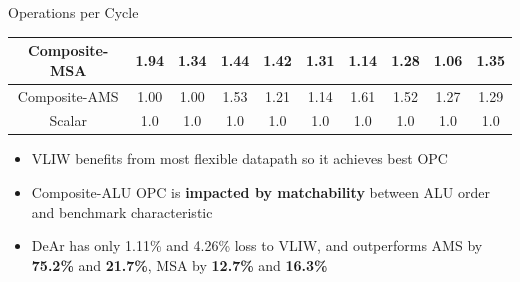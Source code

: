 \documentclass{beamer}
\begin{document}
\begin{CJK}{UTF8}{bkai}
\begin{frame}{Operations per Cycle}
\begin{table}[!ht]
{\begin{tabular}{|c|c|c|c|c|c|c|c|c|c|}
                            Composite-MSA  &   1.94  &   1.34  &   1.44  &   1.42  &   1.31  &   1.14  &   1.28  &   1.06  &   1.35     \\ \hline 
                            Composite-AMS  &   1.00  &   1.00  &   1.53  &   1.21  &   1.14  &   1.61  &   1.52  &   1.27  &   1.29     \\ \hline 
                            Scalar  & 1.0  & 1.0  & 1.0  & 1.0  & 1.0  & 1.0  & 1.0  & 1.0  & 1.0 \\ \hline 
                        \end{tabular}
                    }
                \end{table}
                \vspace{-1em}
                \begin{itemize}
                    \item <2->{VLIW benefits from most flexible datapath so it achieves best OPC}
                    \item <3->{Composite-ALU OPC is \textbf{impacted by matchability} between ALU order and benchmark characteristic}
                    \item <4->{DeAr has only 1.11\% and 4.26\% loss to VLIW, 
                                and outperforms AMS by \textbf{75.2\%} and \textbf{21.7\%},
                                    MSA by \textbf{12.7\%} and \textbf{16.3\%}
                                }
                \end{itemize}

            \end{frame}


\end{CJK}
\end{document}
